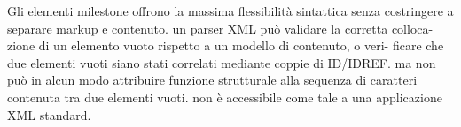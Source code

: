 

Gli elementi milestone offrono la massima flessibilità sintattica senza costringere a separare markup e contenuto. un parser XML può validare la corretta colloca- zione di un elemento vuoto rispetto a un modello di contenuto, o veri- ficare che due elementi vuoti siano stati correlati mediante coppie di ID/IDREF. ma non può in alcun modo attribuire funzione strutturale alla sequenza di caratteri contenuta tra due elementi vuoti. non è accessibile come tale a una applicazione XML standard.

